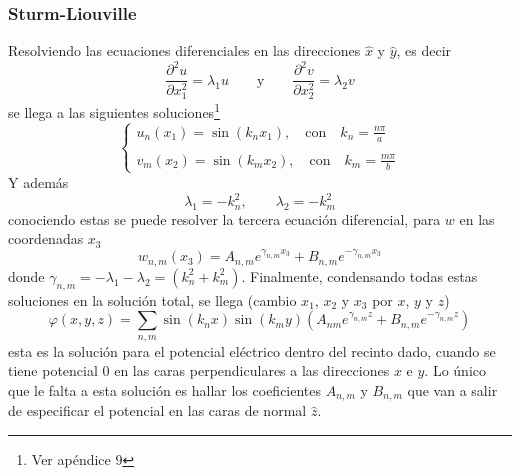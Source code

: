 \subsubsection{Sturm-Liouville}
Resolviendo las ecuaciones diferenciales en las direcciones $\hat{x}$ y $\hat{y}$, es decir
\begin{equation*}
    \frac{\partial^{2}u}{\partial x_{1}^{2}} = \lambda_{1}u
    \quad
    \quad
    \mbox{y}
    \quad
    \quad
    \frac{\partial^{2}v}{\partial x_{2}^{2}} = \lambda_{2}v
\end{equation*}
se llega a las siguientes soluciones\footnote{Ver apéndice 9}
\begin{equation*}
    \left\{
        \begin{matrix}
            u_{n}(x_{1}) = \sin{(k_{n}x_{1})},
            \quad
            \mbox{con}
            \quad k_{n} = \frac{n\pi}{a}\\
            \\
            v_{m}(x_{2}) = \sin{(k_{m}x_{2})},
            \quad
            \mbox{con}
            \quad k_{m} = \frac{m\pi}{b}
        \end{matrix}
    \right.
\end{equation*}
Y además 
\begin{equation*}
    \lambda_{1} = -k_{n}^{2},
    \quad
    \quad 
    \lambda_{2} = -k_{m}^{2}
\end{equation*}
conociendo estas se puede resolver la tercera ecuación diferencial, para $w$ en las coordenadas $x_{3}$
\begin{equation*}
    w_{n,m}(x_{3}) 
    = A_{n,m}e^{\gamma_{n,m}x_{3}} 
    + B_{n,m}e^{-\gamma_{n,m}x_{3}}
\end{equation*}
donde $\gamma_{n,m} = -\lambda_{1}-\lambda_{2} = (k_{n}^{2} + k_{m}^{2})$. Finalmente, condensando todas estas soluciones en la solución total, se llega (cambio $x_{1}$, $x_{2}$ y $x_{3}$ por $x$, $y$ y $z$)
\begin{equation*}
    \varphi(x,y,z) = 
    \sum\limits_{n,m}
    \sin{(k_{n}x)}\sin{(k_{m}y)}
    \left(
        A_{nm}e^{\gamma_{n,m}z} + B_{n,m}e^{-\gamma_{n,m}z}
    \right)
\end{equation*}
esta es la solución para el potencial eléctrico dentro del recinto dado, cuando se tiene potencial 0 en las caras perpendiculares a las direcciones $x$ e $y$. Lo único que le falta a esta solución es hallar los coeficientes $A_{n,m}$ y $B_{n,m}$ que van a salir de especificar el potencial en las caras de normal $\hat{z}$. \\

